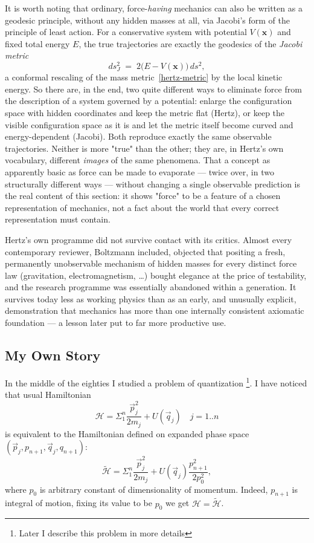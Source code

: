 It is worth noting that ordinary, force-\emph{having} mechanics can
also be written as a geodesic principle, without any hidden masses
at all, via Jacobi's form of the principle of least action. For a
conservative system with potential $V(\mathbf x)$ and fixed total
energy $E$, the true trajectories are exactly the geodesics of the
\emph{Jacobi metric}
\begin{equation*}
  ds_J^2 \;=\; 2\bigl(E-V(\mathbf x)\bigr)\, ds^2 ,
\end{equation*}
a conformal rescaling of the mass metric~\eqref{hertz-metric} by
the local kinetic energy. So there are, in the end, two quite
different ways to eliminate force from the description of a system
governed by a potential: enlarge the configuration space with hidden
coordinates and keep the metric flat (Hertz), or keep the visible
configuration space as it is and let the metric itself become curved
and energy-dependent (Jacobi). Both reproduce exactly the same
observable trajectories. Neither is more "true" than the other; they
are, in Hertz's own vocabulary, different \emph{images} of the same
phenomena. That a concept as apparently basic as force can be made
to evaporate --- twice over, in two structurally different ways ---
without changing a single observable prediction is the real content
of this section: it shows "force" to be a feature of a chosen
representation of mechanics, not a fact about the world that every
correct representation must contain.

Hertz's own programme did not survive contact with its critics.
Almost every contemporary reviewer, Boltzmann included, objected
that positing a fresh, permanently unobservable mechanism of hidden
masses for every distinct force law (gravitation, electromagnetism,
\ldots) bought elegance at the price of testability, and the
research programme was essentially abandoned within a generation. It
survives today less as working physics than as an early, and
unusually explicit, demonstration that mechanics has more than one
internally consistent axiomatic foundation --- a lesson later put to
far more productive use.

\subsection{My Own Story}

In the middle of the eighties I studied a problem of quantization
\footnote{Later I describe this problem in more details}.
I have noticed that usual Hamiltonian
\[\mathcal{H}=\Sigma_1^n \frac{\vec p_j^2}{2 m_j} + U(\vec q_j) \quad j=1..n\]
is equivalent to the Hamiltonian defined on expanded phase space 
$(\vec p_j,p_{n+1},\vec q_j,q_{n+1})$:
\begin{equation}
   \label {lnf:hext}
    \mathcal{\tilde H}=\Sigma_1^n \frac{\vec p_j^2}{2 m_j} + U(\vec q_j) \frac{p_{n+1}^2}{2 p_0^2},
\end{equation}
where $p_0$ is arbitrary constant of dimensionality of momentum. 
Indeed, $p_{n+1}$ is integral of motion, fixing its value to be $p_0$ 
we get $ \mathcal{H}=\mathcal{\tilde H}$.


